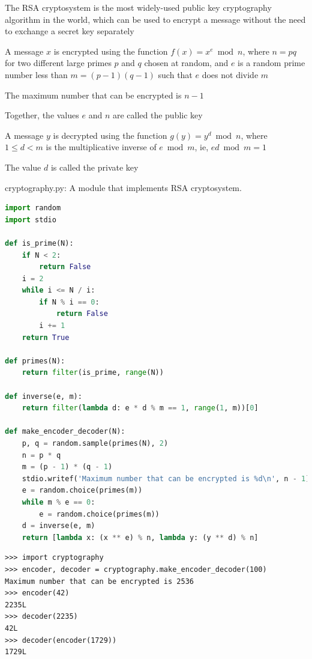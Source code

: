 \documentclass[8pt,a4paper,compress]{beamer}
\begin{document}
\begin{frame}[fragile]
\pause

The RSA cryptosystem is the most widely-used public key cryptography algorithm in the world, which can be used to encrypt a message without the need to exchange a secret key separately

\pause
\bigskip

A message $x$ is encrypted using the function $f(x) = x^e \bmod n$, where $n=pq$ for two different large primes $p$ and $q$ chosen at random, and $e$ is a random prime number less than $m=(p-1)(q-1)$ such that $e$ does not divide $m$

\pause
\bigskip

The maximum number that can be encrypted is $n-1$

\pause
\bigskip

Together, the values $e$ and $n$ are called the public key

\pause
\bigskip

A message $y$ is decrypted using the function $g(y) = y^d \bmod n$, where $1 \leq d < m$ is the multiplicative inverse of $e \bmod m$, ie, $ed \bmod m = 1$

\pause
\bigskip

The value $d$ is called the private key
\end{frame}

\begin{frame}[fragile]
\pause

\begin{framed}
\tiny cryptography.py: A module that implements RSA cryptosystem.
\end{framed}

\begin{lstlisting}[language=Python]
import random
import stdio

def is_prime(N):
    if N < 2: 
        return False
    i = 2
    while i <= N / i:
        if N % i == 0:
            return False
        i += 1
    return True

def primes(N):
    return filter(is_prime, range(N))

def inverse(e, m):
    return filter(lambda d: e * d % m == 1, range(1, m))[0]

def make_encoder_decoder(N):
    p, q = random.sample(primes(N), 2)
    n = p * q
    m = (p - 1) * (q - 1)
    stdio.writef('Maximum number that can be encrypted is %d\n', n - 1)
    e = random.choice(primes(m))
    while m % e == 0:
        e = random.choice(primes(m))
    d = inverse(e, m)
    return [lambda x: (x ** e) % n, lambda y: (y ** d) % n]
\end{lstlisting}
\end{frame}

\begin{frame}[fragile]
\pause

\begin{lstlisting}[language={}]
>>> import cryptography
>>> encoder, decoder = cryptography.make_encoder_decoder(100)
Maximum number that can be encrypted is 2536
>>> encoder(42)
2235L
>>> decoder(2235)
42L
>>> decoder(encoder(1729))
1729L
\end{lstlisting}
\end{frame}
\end{document}
